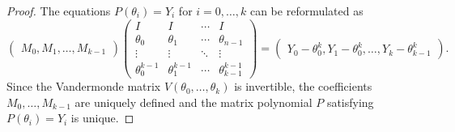 \documentclass[10pt,a4paper]{amsart}
\begin{document}
\begin{proof}
The equations $P(\theta_i)=Y_i$ for $i=0,\ldots,k$ can be reformulated as
    \begin{equation}
  \begin{pmatrix}
    M_0,M_1,\ldots,M_{k-1}
\end{pmatrix}\begin{pmatrix} I & I & \cdots & I \\
\theta_0 & \theta_1& \cdots & \theta_{n-1} \\
\vdots & \vdots & \ddots & \vdots \\
\theta_0^{k-1} &\theta_1^{k-1} & \cdots & \theta_{k-1}^{k-1}
\end{pmatrix}=\begin{pmatrix}
    Y_0-\theta_0^k,Y_1-\theta_0^k,\ldots,Y_{k}-\theta_{k-1}^k
\end{pmatrix}. 
\end{equation} 
Since the Vandermonde matrix $V(\theta_0, \ldots, \theta_k)$ is invertible, the coefficients $M_0, \ldots, M_{k-1}$ are uniquely defined and the matrix polynomial $P$ satisfying $P(\theta_i)=Y_i$ is unique. 
\end{proof}
\end{document}
